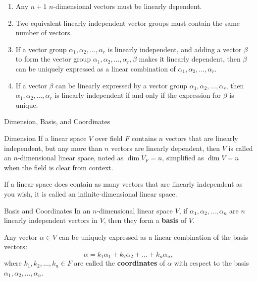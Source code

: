\documentclass[11pt]{../../TexTemplate/elegantbook} %
\begin{document}
\begin{proposition}
\begin{enumerate}
    \item Any \( n+1 \) \( n \)-dimensional vectors must be linearly dependent.
    
    \item Two equivalent linearly independent vector groups must contain the same number of vectors.

    \item If a vector group \( \alpha_1, \alpha_2, \dots, \alpha_r \) is linearly independent, 
        and adding a vector \( \beta \) to form the vector group \( \alpha_1, \alpha_2, \dots, \alpha_r, \beta \) 
        makes it linearly dependent, then \( \beta \) can be uniquely expressed as a linear combination of 
        \( \alpha_1, \alpha_2, \dots, \alpha_r \).

    \item If a vector \( \beta \) can be linearly expressed by a vector group \( \alpha_1, \alpha_2, \dots, \alpha_r \), 
        then \( \alpha_1, \alpha_2, \dots, \alpha_r \) is linearly independent
        if and only if the expression for \( \beta \) is unique.
\end{enumerate}
\end{proposition}

\begin{leftbarTitle}{Dimension, Basis, and Coordinates}\end{leftbarTitle}
\begin{definition}{Dimension}
    If a linear space \( V \) over field \(F\) contains \(n\) vectors that are linearly independent,
    but any more than \(n\) vectors are linearly dependent, 
    then \( V \) is called an \( n \)-dimensional linear space,
    noted as \( \dim V_{F} = n \), simplified as \( \dim V = n \) when the field is clear from context.

    If a linear space does contain as many vectors that are linearly independent as you wish, 
    it is called an infinite-dimensional linear space.
\end{definition}

\begin{definition}{Basis and Coordinates}
    In an \( n \)-dimensional linear space \( V \), 
    if \( \alpha_1, \alpha_2, \dots, \alpha_n \) are \( n \) linearly independent vectors in \( V \),
    then they form a \textbf{basis} of \( V \).

    Any vector \( \alpha \in V \) can be uniquely expressed as a linear combination of the basis vectors:
    \[
    \alpha = k_1\alpha_1 + k_2\alpha_2 + \dots + k_n\alpha_n,
    \]
    where \( k_1, k_2, \dots, k_n \in F \) are called the \textbf{coordinates} of \( \alpha \) with respect to the basis 
    \( \alpha_1, \alpha_2, \dots, \alpha_n \).
\end{definition}
\end{document}
